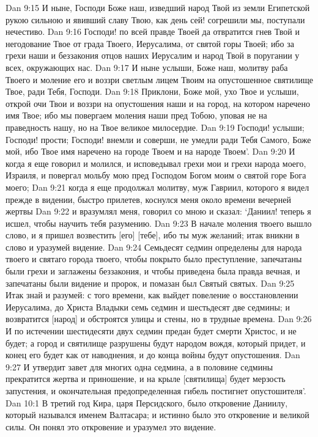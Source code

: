 Dan 9:15  И ныне, Господи Боже наш, изведший народ Твой из земли Египетской рукою сильною и явивший славу Твою, как день сей! согрешили мы, поступали нечестиво.
Dan 9:16  Господи! по всей правде Твоей да отвратится гнев Твой и негодование Твое от града Твоего, Иерусалима, от святой горы Твоей; ибо за грехи наши и беззакония отцов наших Иерусалим и народ Твой в поругании у всех, окружающих нас.
Dan 9:17  И ныне услыши, Боже наш, молитву раба Твоего и моление его и воззри светлым лицем Твоим на опустошенное святилище Твое, ради Тебя, Господи.
Dan 9:18  Приклони, Боже мой, ухо Твое и услыши, открой очи Твои и воззри на опустошения наши и на город, на котором наречено имя Твое; ибо мы повергаем моления наши пред Тобою, уповая не на праведность нашу, но на Твое великое милосердие.
Dan 9:19  Господи! услыши; Господи! прости; Господи! внемли и соверши, не умедли ради Тебя Самого, Боже мой, ибо Твое имя наречено на городе Твоем и на народе Твоем'.
Dan 9:20  И когда я еще говорил и молился, и исповедывал грехи мои и грехи народа моего, Израиля, и повергал мольбу мою пред Господом Богом моим о святой горе Бога моего;
Dan 9:21  когда я еще продолжал молитву, муж Гавриил, которого я видел прежде в видении, быстро прилетев, коснулся меня около времени вечерней жертвы
Dan 9:22  и вразумлял меня, говорил со мною и сказал: `Даниил! теперь я исшел, чтобы научить тебя разумению.
Dan 9:23  В начале моления твоего вышло слово, и я пришел возвестить [его] [тебе], ибо ты муж желаний; итак вникни в слово и уразумей видение.
Dan 9:24  Семьдесят седмин определены для народа твоего и святаго города твоего, чтобы покрыто было преступление, запечатаны были грехи и заглажены беззакония, и чтобы приведена была правда вечная, и запечатаны были видение и пророк, и помазан был Святый святых.
Dan 9:25  Итак знай и разумей: с того времени, как выйдет повеление о восстановлении Иерусалима, до Христа Владыки семь седмин и шестьдесят две седмины; и возвратится [народ] и обстроятся улицы и стены, но в трудные времена.
Dan 9:26  И по истечении шестидесяти двух седмин предан будет смерти Христос, и не будет; а город и святилище разрушены будут народом вождя, который придет, и конец его будет как от наводнения, и до конца войны будут опустошения.
Dan 9:27  И утвердит завет для многих одна седмина, а в половине седмины прекратится жертва и приношение, и на крыле [святилища] будет мерзость запустения, и окончательная предопределенная гибель постигнет опустошителя'.
Dan 10:1  В третий год Кира, царя Персидского, было откровение Даниилу, который назывался именем Валтасара; и истинно было это откровение и великой силы. Он понял это откровение и уразумел это видение.
